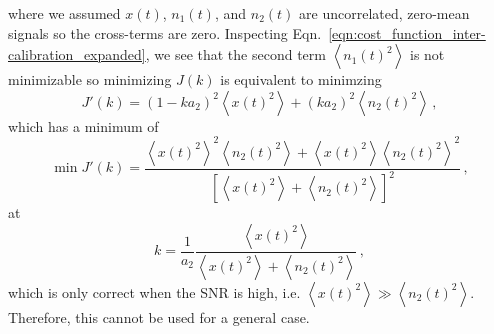 where we assumed $x(t)$, $n_1(t)$, and $n_2(t)$ are uncorrelated, zero-mean signals so the cross-terms are zero.
Inspecting Eqn.~\eqref{eqn:cost_function_inter-calibration_expanded}, we see that the second term $\left\langle n_1(t)^2 \right\rangle$ is not minimizable so minimizing $J(k)$ is equivalent to minimzing
\begin{equation}
	J'(k) = \left(1-ka_2\right)^2\left\langle x(t)^2 \right\rangle + \left(ka_2\right)^2\left\langle n_2(t)^2 \right\rangle\,,
	\label{eqn:cost_function_inter-calibration_equivalent}
\end{equation} 
which has a minimum of
\begin{equation}
	\min J'(k) = \frac{\left\langle x(t)^2 \right\rangle^2 \left\langle n_2(t)^2\right\rangle + \left\langle x(t)^2 \right\rangle \left\langle n_2(t)^2\right\rangle^2}{\left[\left\langle x(t)^2\right\rangle + \left\langle n_2(t)^2\right\rangle\right]^2}\,,
\end{equation}
at
\begin{equation}
	k = \frac{1}{a_2}\frac{\left\langle x(t)^2 \right\rangle}{\left\langle x(t)^2 \right\rangle + \left\langle n_2(t)^2 \right\rangle}\,,
\end{equation}
which is only correct when the SNR is high, i.e. $\left\langle x(t)^2 \right\rangle \gg \left\langle n_2(t)^2 \right\rangle$.
Therefore, this cannot be used for a general case.

